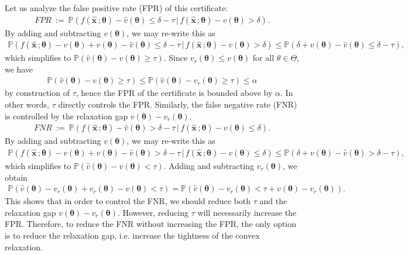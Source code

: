 \documentclass[10pt]{article} %
\theoremstyle{plain}
\theoremstyle{definition}
\theoremstyle{remark}
\begin{document}
Let us analyze the false positive rate (FPR) of this certificate:
\begin{align*}
    \mathit{FPR} ~:=~ \mathbb{P}(f(\hat{\mathbf{x}}\, ; \bm{\theta}) - \hat{v}(\bm{\theta}) \leq \delta - \tau \,|\, f(\hat{\mathbf{x}}\, ; \bm{\theta}) - v(\bm{\theta}) > \delta).
\end{align*}
By adding and subtracting $v(\bm{\theta})$, we may re-write this as
\begin{align*}
    \mathbb{P}(f(\hat{\mathbf{x}}\, ; \bm{\theta}) - v(\bm{\theta}) + v(\bm{\theta}) - \hat{v}(\bm{\theta}) \leq \delta - \tau \,|\, f(\hat{\mathbf{x}}\, ; \bm{\theta}) - v(\bm{\theta}) > \delta)
    \leq \mathbb{P}(\delta + v(\bm{\theta}) - \hat{v}(\bm{\theta}) \leq \delta - \tau),
\end{align*}
which simplifies to $\mathbb{P}(\hat{v}(\bm{\theta}) - v(\bm{\theta}) \geq \tau)$. Since $v_r(\bm{\theta}) \leq v(\bm{\theta})$ for all $\theta \in \Theta$, we have
\begin{align*}
    \mathbb{P}(\hat{v}(\bm{\theta}) - v(\bm{\theta}) \geq \tau) \leq \mathbb{P}(\hat{v}(\bm{\theta}) - v_r(\bm{\theta}) \geq \tau) \leq \alpha
\end{align*}
by construction of $\tau$, hence the FPR of the certificate is bounded above by $\alpha$. In other words, $\tau$ directly controls the FPR. Similarly, the false negative rate (FNR) is controlled by the relaxation gap $v(\bm{\theta}) - v_r(\bm{\theta})$.
\begin{align*}
    \mathit{FNR} ~:=~ \mathbb{P}(f(\hat{\mathbf{x}}\, ; \bm{\theta}) - \hat{v}(\bm{\theta}) > \delta - \tau \,|\, f(\hat{\mathbf{x}}\, ; \bm{\theta}) - v(\bm{\theta}) \leq \delta).
\end{align*}
By adding and subtracting $v(\bm{\theta})$, we may re-write this as
\begin{align*}
    \mathbb{P}(f(\hat{\mathbf{x}}\, ; \bm{\theta}) - v(\bm{\theta}) + v(\bm{\theta}) - \hat{v}(\bm{\theta}) > \delta - \tau \,|\, f(\hat{\mathbf{x}}\, ; \bm{\theta}) - v(\bm{\theta}) \leq \delta)
    \leq \mathbb{P}(\delta + v(\bm{\theta}) - \hat{v}(\bm{\theta}) > \delta - \tau),
\end{align*}
which simplifies to $\mathbb{P}(\hat{v}(\bm{\theta}) - v(\bm{\theta}) < \tau)$. Adding and subtracting $v_r(\bm{\theta})$, we obtain
\begin{align*}
    \mathbb{P}(\hat{v}(\bm{\theta}) - v_r(\bm{\theta}) + v_r(\bm{\theta}) - v(\bm{\theta}) < \tau) = \mathbb{P}(\hat{v}(\bm{\theta}) - v_r(\bm{\theta}) < \tau + v(\bm{\theta}) - v_r(\bm{\theta})).
\end{align*}
This shows that in order to control the FNR, we should reduce both $\tau$ and the relaxation gap $v(\bm{\theta}) - v_r(\bm{\theta})$. However, reducing $\tau$ will necessarily increase the FPR. Therefore, to reduce the FNR without increasing the FPR, the only option is to reduce the relaxation gap, i.e. increase the tightness of the convex relaxation.
\end{document}
